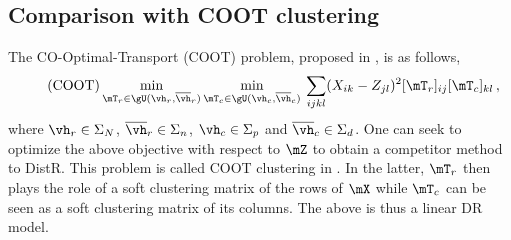 \subsection{Comparison with COOT clustering}\label{sec:coot_exp}

The CO-Optimal-Transport (COOT) problem, proposed in \cite{redko2020co}, is as follows,
\begin{align}\tag{COOT}
	\label{eq:coot_pb}
	\min_{\mT_r \in \gU(\vh_r, \overline{\vh}_r)} \min_{ \mT_c \in \gU(\vh_c, \overline{\vh}_c)} \: \sum_{ijkl} (X_{ik} - Z_{jl})^2 [\mT_r]_{ij} [\mT_c]_{kl} \,,
\end{align}
where $\vh_r \in \Sigma_N$, $\overline{\vh}_r \in \Sigma_n$, $\vh_c \in \Sigma_p$ and $\overline{\vh}_c \in \Sigma_d$. 
One can seek to optimize the above objective with respect to $\mZ$ to obtain a competitor method to DistR. This problem is called COOT clustering in \cite{redko2020co}. In the latter, $\mT_r$ then plays the role of a soft clustering matrix of the rows of $\mX$ while $\mT_c$ can be seen as a soft clustering matrix of its columns. The above is thus a linear DR model.


